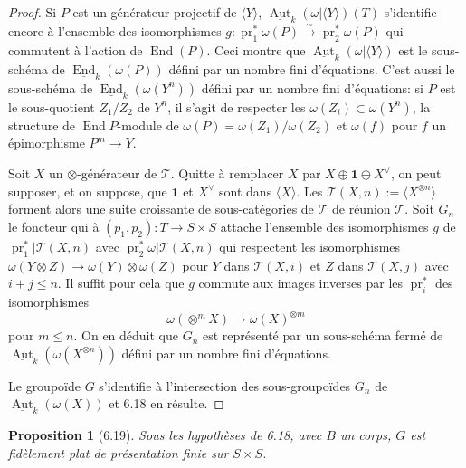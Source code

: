 \documentclass[12pt,a4paper]{article}
\theoremstyle{plain}
\newtheorem{proposition}[theorem]{Proposition}
\theoremstyle{definition}
\DeclareMathOperator{\End}{End}
\DeclareMathOperator{\Aut}{Aut}
\DeclareMathOperator{\pr}{pr}
\begin{document}
\begin{proof}
Si $P$ est un générateur projectif de $\langle Y \rangle$, $\underline{\Aut}_k(\omega|\langle Y \rangle)(T)$ s'identifie encore à l'ensemble des isomorphismes $g : \pr_1^*\omega(P) \xrightarrow{\sim} \pr_2^*\omega(P)$ qui commutent à l'action de $\End(P)$. Ceci montre que $\underline{\Aut}_k(\omega|\langle Y \rangle)$ est le sous-schéma de $\underline{\End}_k(\omega(P))$ défini par un nombre fini d'équations. C'est aussi le sous-schéma de $\underline{\End}_k(\omega(Y^n))$ défini par un nombre fini d'équations: si $P$ est le sous-quotient $Z_1/Z_2$ de $Y^n$, il s'agit de respecter les $\omega(Z_i) \subset \omega(Y^n)$, la structure de $\End P$-module de $\omega(P) = \omega(Z_1)/\omega(Z_2)$ et $\omega(f)$ pour $f$ un épimorphisme $P^m \to Y$.

Soit $X$ un $\otimes$-générateur de $\mathcal{T}$. Quitte à remplacer $X$ par $X \oplus \mathbf{1} \oplus X^\vee$, on peut supposer, et on suppose, que $\mathbf{1}$ et $X^\vee$ sont dans $\langle X \rangle$. Les $\mathcal{T}(X, n) := \langle X^{\otimes n} \rangle$ forment alors une suite croissante de sous-catégories de $\mathcal{T}$ de réunion $\mathcal{T}$. Soit $G_n$ le foncteur qui à $(p_1, p_2) : T \to S \times S$ attache l'ensemble des isomorphismes $g$ de $\pr_1^*|\mathcal{T}(X, n)$ avec $\pr_2^*\omega|\mathcal{T}(X, n)$ qui respectent les isomorphismes $\omega(Y \otimes Z) \to \omega(Y) \otimes \omega(Z)$ pour $Y$ dans $\mathcal{T}(X, i)$ et $Z$ dans $\mathcal{T}(X, j)$ avec $i + j \leq n$. Il suffit pour cela que $g$ commute aux images inverses par les $\pr_i^*$ des isomorphismes
\[
\omega(\otimes^m X) \to \omega(X)^{\otimes m}
\]
pour $m \leq n$. On en déduit que $G_n$ est représenté par un sous-schéma fermé de $\underline{\Aut}_k(\omega(X^{\otimes n}))$ défini par un nombre fini d'équations.

Le groupoïde $G$ s'identifie à l'intersection des sous-groupoïdes $G_n$ de $\underline{\Aut}_k(\omega(X))$ et 6.18 en résulte.
\end{proof}

\begin{proposition}[6.19]
Sous les hypothèses de 6.18, avec $B$ un corps, $G$ est fidèlement plat de présentation finie sur $S \times S$.
\end{proposition}
\end{document}
